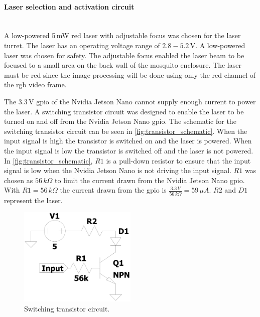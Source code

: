 \paragraph{Laser selection and activation circuit}\label{par:laser_activation}\hfill\\
A low-powered 5\,mW red laser with adjustable focus was chosen for the laser turret. The laser has an operating voltage range of $2.8 - 5.2$\,V. A low-powered laser was chosen for safety. The adjustable focus enabled the laser beam to be focused to a small area on the back wall of the mosquito enclosure. The laser must be red since the image processing will be done using only the red channel of the \gls{rgb} video frame.

The 3.3\,V \gls{gpio} of the Nvidia Jetson Nano cannot supply enough current to power the laser. A switching transistor circuit was designed to enable the laser to be turned on and off from the Nvidia Jetson Nano \gls{gpio}. The schematic for the switching transistor circuit can be seen in \autoref{fig:transistor_schematic}.  When the input signal is high the transistor is switched on and the laser is powered. When the input signal is low the transistor is switched off and the laser is not powered. In \autoref{fig:transistor_schematic}, $R1$ is a pull-down resistor to ensure that the input signal is low when the Nvidia Jetson Nano is not driving the input signal. $R1$ was chosen as $56\,k\Omega$ to limit the current drawn from the Nvidia Jetson Nano \gls{gpio}. With $R1 = 56\,k\Omega$ the current drawn from the \gls{gpio} is $\frac{3.3\,V}{56\,k\Omega} = 59\,\mu A$. $R2$ and $D1$ represent the laser.
\begin{figure}[h]
  \centering
  \includegraphics[width=0.5\textwidth]{figures/hardware_design/laser_transistor_schematic.pdf}
  \caption{Switching transistor circuit.}
  \label{fig:transistor_schematic}
\end{figure}


